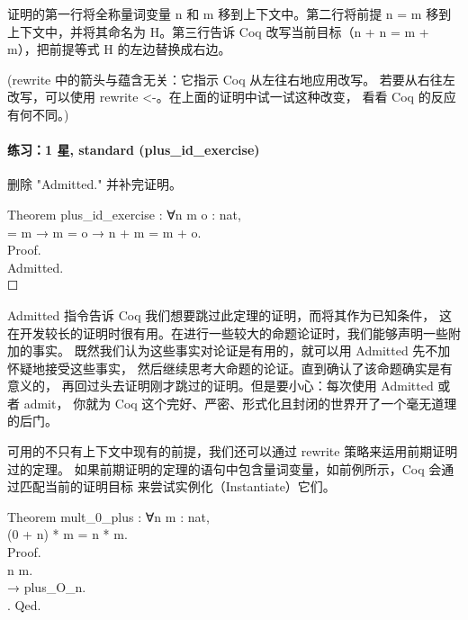\documentclass[utf8]{ctexart}
\let\oldparagraph\paragraph
\renewcommand{\paragraph}[1]{\oldparagraph{#1}\mbox{}}
\begin{document}
证明的第一行将全称量词变量 {{n}} 和 {{m}} 移到上下文中。第二行将前提
{{n}} {=} {{m}} 移到上下文中，并将其命名为 {{H}}。第三行告诉 Coq
改写当前目标（{{n}} {+} {{n}} {=} {{m}} {+} {{m}}），把前提等式 {{H}}
的左边替换成右边。

({{rewrite}} 中的箭头与蕴含无关：它指示 Coq 从左往右地应用改写。
若要从右往左改写，可以使用 {{rewrite}}
{\textless-}。在上面的证明中试一试这种改变， 看看 Coq 的反应有何不同。)

\protect\hypertarget{lab35}{}{}

\hypertarget{ux7ec3ux4e601-ux661f-standard-plus_id_exercise}{%
\paragraph{练习：1 星, standard
(plus\_id\_exercise)}\label{ux7ec3ux4e601-ux661f-standard-plus_id_exercise}}

删除 "{{Admitted}.}" 并补完证明。

{Theorem} {plus\_id\_exercise} : {∀}{n} {m} {o} : {nat},\\
\hspace*{0.333em}\hspace*{0.333em}{n} = {m} → {m} = {o} → {n} + {m} =
{m} + {o}.\\
{Proof}.\\
\hspace*{0.333em}\hspace*{0.333em}{(*~请在此处解答~*)} {Admitted}.\\

{☐}

{{Admitted}} 指令告诉 Coq 我们想要跳过此定理的证明，而将其作为已知条件，
这在开发较长的证明时很有用。在进行一些较大的命题论证时，我们能够声明一些附加的事实。
既然我们认为这些事实对论证是有用的，就可以用 {{Admitted}}
先不加怀疑地接受这些事实，
然后继续思考大命题的论证。直到确认了该命题确实是有意义的，
再回过头去证明刚才跳过的证明。但是要小心：每次使用 {{Admitted}} 或者
{{admit}}， 你就为 Coq
这个完好、严密、形式化且封闭的世界开了一个毫无道理的后门。

可用的不只有上下文中现有的前提，我们还可以通过 {{rewrite}}
策略来运用前期证明过的定理。
如果前期证明的定理的语句中包含量词变量，如前例所示，Coq
会通过匹配当前的证明目标 来尝试实例化（Instantiate）它们。

{Theorem} {mult\_0\_plus} : {∀}{n} {m} : {nat},\\
\hspace*{0.333em}\hspace*{0.333em}(0 + {n}) * {m} = {n} * {m}.\\
{Proof}.\\
\hspace*{0.333em}\hspace*{0.333em}{intros} {n} {m}.\\
\hspace*{0.333em}\hspace*{0.333em}{rewrite} → {plus\_O\_n}.\\
\hspace*{0.333em}\hspace*{0.333em}{reflexivity}. {Qed}.\\
\end{document}
